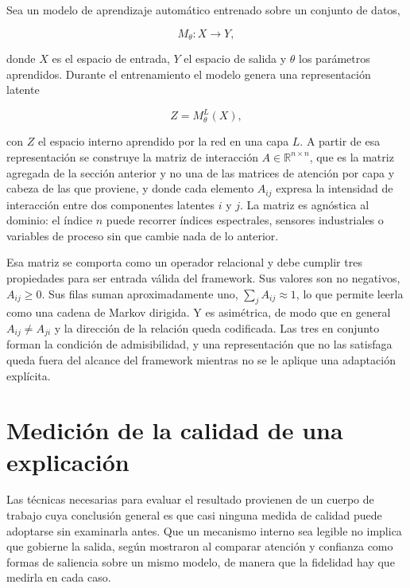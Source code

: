 Sea un modelo de aprendizaje automático entrenado sobre un conjunto de datos,

\begin{equation}
M_\theta : X \to Y,
\end{equation}

donde $X$ es el espacio de entrada, $Y$ el espacio de salida y $\theta$ los parámetros aprendidos. Durante el entrenamiento el modelo genera una representación latente

\begin{equation}
Z = M^{L}_{\theta}(X),
\end{equation}

con $Z$ el espacio interno aprendido por la red en una capa $L$. A partir de esa representación se construye la matriz de interacción $A \in \mathbb{R}^{n\times n}$, que es la matriz agregada de la sección anterior y no una de las matrices de atención por capa y cabeza de las que proviene, y donde cada elemento $A_{ij}$ expresa la intensidad de interacción entre dos componentes latentes $i$ y $j$. La matriz es agnóstica al dominio: el índice $n$ puede recorrer índices espectrales, sensores industriales o variables de proceso sin que cambie nada de lo anterior.

Esa matriz se comporta como un operador relacional y debe cumplir tres propiedades para ser entrada válida del framework. Sus valores son no negativos, $A_{ij} \geq 0$. Sus filas suman aproximadamente uno, $\sum_j A_{ij} \approx 1$, lo que permite leerla como una cadena de Markov dirigida. Y es asimétrica, de modo que en general $A_{ij} \neq A_{ji}$ y la dirección de la relación queda codificada. Las tres en conjunto forman la condición de admisibilidad, y una representación que no las satisfaga queda fuera del alcance del framework mientras no se le aplique una adaptación explícita.

\section{Medición de la calidad de una explicación}

Las técnicas necesarias para evaluar el resultado provienen de un cuerpo de trabajo cuya conclusión general es que casi ninguna medida de calidad puede adoptarse sin examinarla antes. Que un mecanismo interno sea legible no implica que gobierne la salida, según mostraron \textcite{rizzo2022faithfulness} al comparar atención y confianza como formas de saliencia sobre un mismo modelo, de manera que la fidelidad hay que medirla en cada caso.

